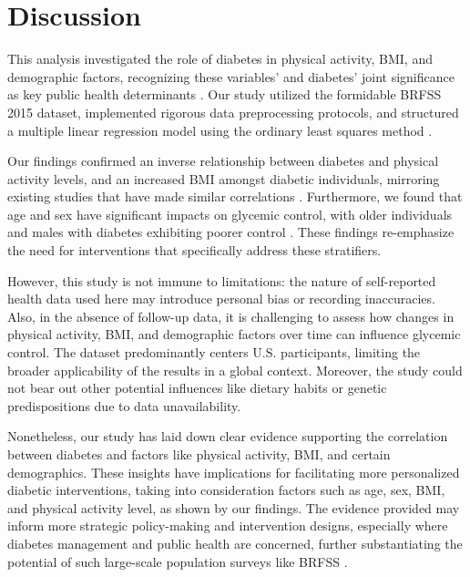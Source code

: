 \documentclass[11pt]{article}
\begin{document}
\section*{Discussion}

This analysis investigated the role of diabetes in physical activity, BMI, and demographic factors, recognizing these variables' and diabetes' joint significance as key public health determinants \cite{Hill-Briggs2020SocialDO, Khan2019EpidemiologyOT, Mozaffarian2016DietaryAP}. Our study utilized the formidable BRFSS 2015 dataset, implemented rigorous data preprocessing protocols, and structured a multiple linear regression model using the ordinary least squares method \cite{Robinson1991SomeSR, Faraway2014LinearMW}.

Our findings confirmed an inverse relationship between diabetes and physical activity levels, and an increased BMI amongst diabetic individuals, mirroring existing studies that have made similar correlations \cite{Bohn2015ImpactOP, Chen2018AssociationOB, Batsis2015ImpactOO}. Furthermore, we found that age and sex have significant impacts on glycemic control, with older individuals and males with diabetes exhibiting poorer control \cite{Chen2018AssociationOB}. These findings re-emphasize the need for interventions that specifically address these stratifiers. 

However, this study is not immune to limitations: the nature of self-reported health data used here may introduce personal bias or recording inaccuracies. Also, in the absence of follow-up data, it is challenging to assess how changes in physical activity, BMI, and demographic factors over time can influence glycemic control. The dataset predominantly centers U.S. participants, limiting the broader applicability of the results in a global context. Moreover, the study could not bear out other potential influences like dietary habits or genetic predispositions due to data unavailability.

Nonetheless, our study has laid down clear evidence supporting the correlation between diabetes and factors like physical activity, BMI, and certain demographics. These insights have implications for facilitating more personalized diabetic interventions, taking into consideration factors such as age, sex, BMI, and physical activity level, as shown by our findings. The evidence provided may inform more strategic policy-making and intervention designs, especially where diabetes management and public health are concerned, further substantiating the potential of such large-scale population surveys like BRFSS \cite{Jafar2006PrevalenceOO}.
\end{document}
